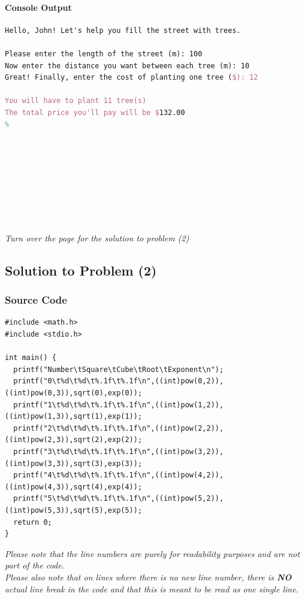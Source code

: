 \documentclass[a4paper,11pt]{article}
\theoremstyle{mytheor}
\theoremstyle{mytheor}
\begin{document}
\paragraph{Console Output}
\begin{lstlisting}[escapechar=\%,language=tex,numbers=none,label={list:second},title=Program's output to console in plaintext -- using inputs from test sample (1)]
Hello, John! Let's help you fill the street with trees.

Please enter the length of the street (m): 100
Now enter the distance you want between each tree (m): 10
Great! Finally, enter the cost of planting one tree ($): 12

You will have to plant 11 tree(s)
The total price you'll pay will be $132.00
%
\end{lstlisting}
\begin{center}
\textit{\\\ \\\ \\\ \\\ \\\ \\\ \\\ \\Turn over the page for the solution to problem (2)}
\end{center}
\newpage
\subsection{Solution to Problem (2)}
\subsubsection{Source Code}
\begin{lstlisting}[label={list:third},title=Program's \texttt{\color{inlinecode}{main.c}} File -- console application to output the full table as described in the problem]
#include <math.h>
#include <stdio.h>

int main() {
  printf("Number\tSquare\tCube\tRoot\tExponent\n");
  printf("0\t%d\t%d\t%.1f\t%.1f\n",((int)pow(0,2)),((int)pow(0,3)),sqrt(0),exp(0));
  printf("1\t%d\t%d\t%.1f\t%.1f\n",((int)pow(1,2)),((int)pow(1,3)),sqrt(1),exp(1));
  printf("2\t%d\t%d\t%.1f\t%.1f\n",((int)pow(2,2)),((int)pow(2,3)),sqrt(2),exp(2));
  printf("3\t%d\t%d\t%.1f\t%.1f\n",((int)pow(3,2)),((int)pow(3,3)),sqrt(3),exp(3));
  printf("4\t%d\t%d\t%.1f\t%.1f\n",((int)pow(4,2)),((int)pow(4,3)),sqrt(4),exp(4));
  printf("5\t%d\t%d\t%.1f\t%.1f\n",((int)pow(5,2)),((int)pow(5,3)),sqrt(5),exp(5));
  return 0;
}
\end{lstlisting}
\textsl{Please note that the line numbers are purely for readability purposes and are not part of the code.\\Please also note that on lines where there is no new line number, there is \textbf{NO} actual line break in the code and that this is meant to be read as one single line.}
\end{document}
